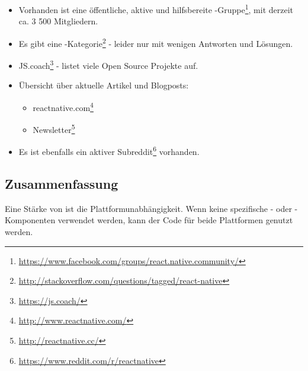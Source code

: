 \begin{itemize}
	\item Vorhanden ist eine öffentliche, aktive und hilfsbereite -Gruppe\footnote{\url{https://www.facebook.com/groups/react.native.community/}}, mit derzeit ca. 3 500 Mitgliedern.
	\item Es gibt eine -Kategorie\footnote{\url{http://stackoverflow.com/questions/tagged/react-native}} - leider nur mit wenigen Antworten und Lösungen.
	\item JS.coach\footnote{\url{https://js.coach/}} - listet viele Open Source Projekte auf.
	\item Übersicht über aktuelle Artikel und Blogposts: 
	\begin{itemize}
		\item reactnative.com\footnote{\url{http://www.reactnative.com/}}
		\item {} Newsletter\footnote{\url{http://reactnative.cc/}}
	\end{itemize}
	\item Es ist ebenfalls ein aktiver Subreddit\footnote{\url{https://www.reddit.com/r/reactnative}} vorhanden.
\end{itemize}


\subsection{Zusammenfassung}
Eine Stärke von  ist die Plattformunabhängigkeit. 
Wenn keine spezifische - oder -Komponenten verwendet werden, kann der Code für beide Plattformen genutzt werden.


